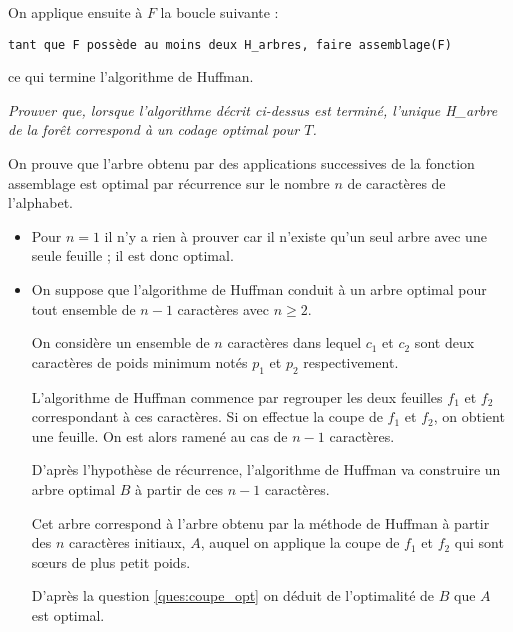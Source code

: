 On applique ensuite à $F$ la boucle suivante :
\begin{lstlisting}
tant que F possède au moins deux H_arbres, faire assemblage(F)
\end{lstlisting}
ce qui termine l’algorithme de Huffman.
\begin{Exercise}\it
Prouver que, lorsque l’algorithme décrit ci-dessus est terminé, l’unique H\_arbre de la forêt
correspond à un codage optimal pour $T$.
\end{Exercise}
\begin{Answer}
On prouve que l'arbre obtenu par des applications successives de la fonction assemblage est optimal  par récurrence sur le nombre $n$ de caractères de l’alphabet.

\begin{itemize}
\item Pour $n=1$ il n'y a rien à prouver car il n'existe qu'un seul arbre avec une seule feuille ; il est donc optimal.

\item On suppose que l'algorithme de Huffman conduit à un arbre optimal pour tout ensemble de $n-1$ caractères avec $n\ge 2$. 

On considère un ensemble de $n$ caractères dans lequel $c_1$ et $c_2$ sont deux caractères de poids minimum notés $p_1$ et $p_2$ respectivement.

L’algorithme de Huffman commence par regrouper les deux feuilles $f_1$ et $f_2$ correspondant à ces caractères. Si on effectue la coupe de $f_1$ et $f_2$, on obtient une feuille. On est alors ramené au cas de $n-1$ caractères.

D'après l'hypothèse de récurrence, l'algorithme de Huffman va construire un arbre optimal $B$ à partir de ces $n-1$ caractères.

Cet arbre correspond à l'arbre obtenu par la méthode de Huffman à partir des $n$ caractères initiaux, $A$, auquel on applique la coupe de $f_1$ et $f_2$ qui sont sœurs de plus petit poids.

D'après la question \ref{ques:coupe_opt} on  déduit de l'optimalité de $B$ que $A$ est optimal.
\end{itemize}
\newpage
\end{Answer}
